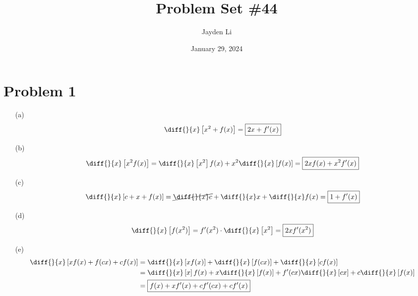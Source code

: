 \documentclass{article}
\title{Problem Set \#44}
\author{Jayden Li}
\date{January 29, 2024}
\begin{document}
\fontsize{12pt}{12pt}\selectfont

\maketitle

\section*{Problem 1}
\begin{itemize}
\item[(a)]
	\begin{equation*}
		\diff{}{x}\left[x^2+f(x)\right]=\boxed{2x+f'(x)}
	\end{equation*}

\item[(b)]
	\begin{equation*}
		\diff{}{x}\left[x^2f(x)\right]=\diff{}{x}\left[x^2\right]f(x)+x^2\diff{}{x}\left[f(x)\right]=\boxed{2xf(x)+x^2f'(x)}
	\end{equation*}

\item[(c)]
	\begin{equation*}
		\diff{}{x}\left[c+x+f(x)\right]=\cancel{\diff{}{x}c}+\diff{}{x}x+\diff{}{x}f(x)=\boxed{1+f'(x)}
	\end{equation*}

\item[(d)]
	\begin{equation*}
		\diff{}{x}\left[f(x^2)\right]=f'(x^2)\cdot\diff{}{x}\left[x^2\right]=\boxed{2xf'(x^2)}
	\end{equation*}

\item[(e)]
	\begin{align*}
		\diff{}{x}\left[xf(x)+f(cx)+cf(x)\right]&=\diff{}{x}\left[xf(x)\right]+\diff{}{x}\left[f(cx)\right]+\diff{}{x}\left[cf(x)\right] \\
		&=\diff{}{x}\left[x\right]f(x)+x\diff{}{x}\left[f(x)\right]+f'(cx)\diff{}{x}\left[cx\right]+c\diff{}{x}\left[f(x)\right] \\
		&=\boxed{f(x)+xf'(x)+cf'(cx)+cf'(x)}
	\end{align*}
\end{itemize}
\end{document}
